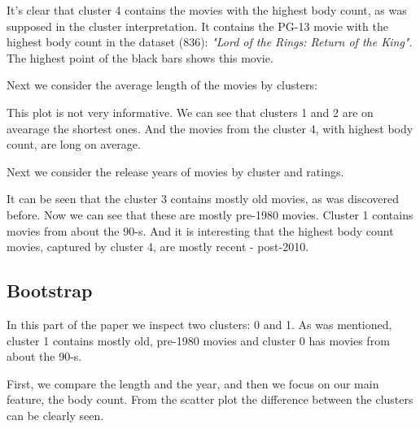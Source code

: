 \documentclass[a4paper,14pt]{article}
\begin{document}
It's clear that cluster 4 contains the movies with the highest body count, as was supposed in the cluster interpretation. It contains the PG-13 movie with the highest body count in the dataset (836): \textit{"Lord of the Rings: Return of the King"}. The highest point of the black bars shows this movie. 

Next we consider the average length of the movies by clusters: 
\begin{center}
\end{center}
 
This plot is not very informative. We can see that clusters 1 and 2 are on avearage the shortest ones. And the movies from the cluster 4, with highest body count, are long on average. 

Next we consider the release years of movies by cluster and ratings.

\begin{center}
\end{center}
 
It can be seen that the cluster 3 contains mostly old movies, as was discovered before. Now we can see that these are mostly pre-1980 movies. Cluster 1 contains movies from about the 90-s.
And it is interesting that the highest body count movies, captured by cluster 4, are mostly recent - post-2010.




\subsection{Bootstrap}

In this part of the paper we inspect two clusters: 0 and 1. As was mentioned, cluster 1 contains mostly old, pre-1980 movies and cluster 0 has movies from about the 90-s.

First, we compare the length and the year, and then we focus on our main feature, the body count. From the scatter plot the difference between the clusters can be clearly seen.
            
\begin{center}
\end{center}
 
\end{document}
